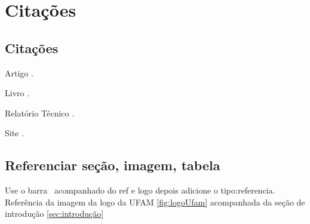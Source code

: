 
\chapter{Citações}

	\section{Citações}
	    
		Artigo \cite{higginbottom1998performance}.
		
        Livro \cite{kurose2013computer}.
        
        Relatório Técnico \cite{Scott2007}.
        
        Site \cite{Raspberry}.
		
	\section{Referenciar seção, imagem, tabela}
	    Use o barra \ acompanhado do ref e logo depois adicione o tipo:referencia. Referência da imagem da logo da UFAM \ref{fig:logoUfam} acompanhada da seção de introdução \ref{sec:introdução}
		
